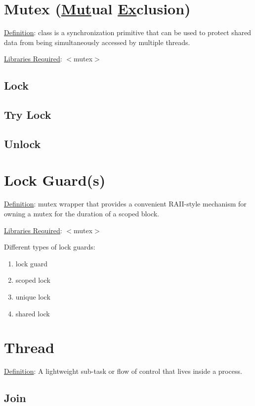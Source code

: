 \documentclass[twocolumn]{article}
\begin{document}
\section{Mutex (\underline{Mut}ual \underline{Ex}clusion)}

\underline{Definition}: class is a synchronization primitive that can be used to protect shared data from being simultaneously accessed by multiple threads.

\bigbreak \noindent \underline{Libraries Required}: $<$mutex$>$

\subsection{Lock}

\subsection{Try Lock}

\subsection{Unlock}

\section{Lock Guard(s)}
\underline{Definition}: mutex wrapper that provides a convenient RAII-style mechanism for owning a mutex for the duration of a scoped block.

\bigbreak \noindent \underline{Libraries Required}: $<$mutex$>$

\noindent Different types of lock guards:
\begin{enumerate}
    \item lock guard
    \item scoped lock
    \item unique lock
    \item shared lock
\end{enumerate}

\section{Thread} \label{sec:thread}
\underline{Definition}: A lightweight sub-task or flow of control that lives inside a process.

\subsection{Join}
\end{document}
